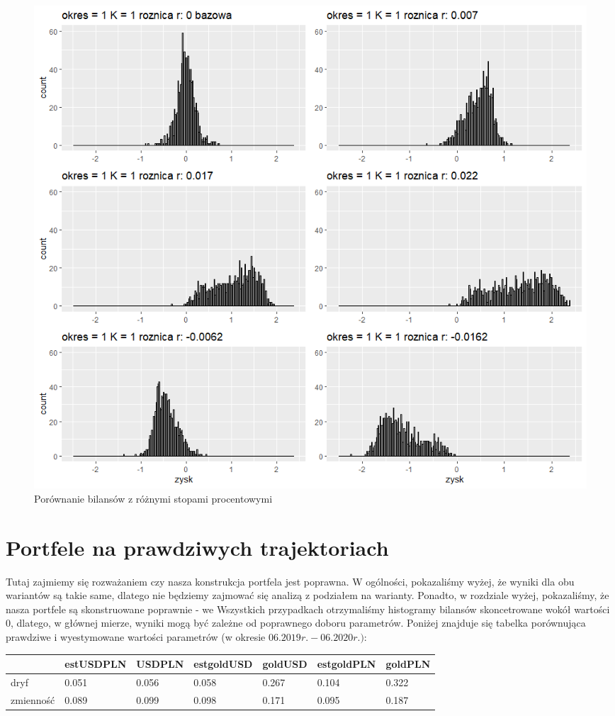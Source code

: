 \documentclass[12pt]{article}
\begin{document}
\begin{figure}[ht!]
\centering
\includegraphics[width=\linewidth]{bilanse_gold_1_zmiana_r.png}
\caption{Porównanie bilansów z różnymi stopami procentowymi}
\end{figure}


\newpage

\section{Portfele na prawdziwych trajektoriach}

Tutaj zajmiemy się rozważaniem czy nasza konstrukcja portfela jest poprawna. W ogólności, pokazaliśmy wyżej, że wyniki dla obu wariantów są takie same, dlatego nie będziemy zajmować się analizą z podziałem na warianty. Ponadto, w rozdziale wyżej, pokazaliśmy, że nasza portfele są skonstruowane poprawnie - we Wszystkich przypadkach otrzymaliśmy histogramy bilansów skoncetrowane wokół wartości $0$, dlatego, w głównej mierze, wyniki mogą być zależne od poprawnego doboru parametrów. Poniżej znajduje się tabelka porównująca prawdziwe i wyestymowane wartości parametrów (w okresie $06.2019r.-06.2020r.)$:

\begin{table}[h]
\begin{tabular}{|l|l|l|l|l|l|l|}
\hline
          & estUSDPLN & USDPLN & estgoldUSD & goldUSD & estgoldPLN & goldPLN \\ \hline
dryf      & 0.051     & 0.056  & 0.058      & 0.267   & 0.104      & 0.322   \\ \hline
zmienność & 0.089     & 0.099  & 0.098      & 0.171   & 0.095      & 0.187   \\ \hline
\end{tabular}
\end{table}
\end{document}
